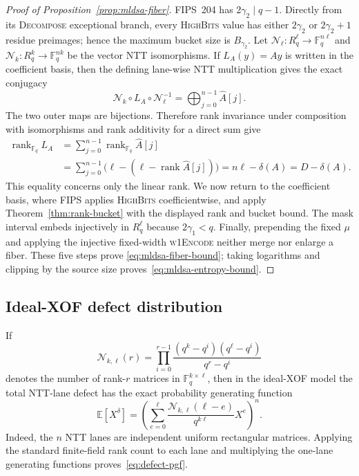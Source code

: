 \documentclass[pdflatex,sn-mathphys-num]{sn-jnl}
\theoremstyle{thmstyleone}
\theoremstyle{thmstyletwo}
\newcommand{\rank}{\operatorname{rank}}
\newcommand{\E}{\mathbb E}
\begin{document}
\begin{proof}[Proof of Proposition~\ref{prop:mldsa-fiber}]
FIPS~204 has $2\gamma_2\mid q-1$.  Directly from its
\textsc{Decompose} exceptional branch, every \textsc{HighBits} value has
either $2\gamma_2$ or $2\gamma_2+1$ residue preimages; hence the maximum
bucket size is $B_{\gamma_2}$.  Let
$\mathcal N_\ell:R_q^\ell\to\mathbb F_q^{n\ell}$ and
$\mathcal N_k:R_q^k\to\mathbb F_q^{nk}$ be the vector NTT isomorphisms.  If
$L_A(y)=Ay$ is written in the coefficient basis, then the defining lane-wise
NTT multiplication gives the exact conjugacy
\begin{equation}
 \mathcal N_k\circ L_A\circ\mathcal N_\ell^{-1}
   =\bigoplus_{j=0}^{n-1}\widehat A[j].
   \label{eq:mldsa-ntt-conjugacy}
\end{equation}
The two outer maps are bijections.  Therefore rank invariance under
composition with isomorphisms and rank additivity for a direct sum give
\begin{align*}
 \rank_{\mathbb F_q}L_A
 &=\sum_{j=0}^{n-1}\rank_{\mathbb F_q}\widehat A[j]\\
 &=\sum_{j=0}^{n-1}\bigl(\ell-(\ell-\rank\widehat A[j])\bigr)
   =n\ell-\delta(A)=D-\delta(A).
\end{align*}
This equality concerns only the linear rank.  We now return to the coefficient
basis, where FIPS applies \textsc{HighBits} coefficientwise, and apply
Theorem~\ref{thm:rank-bucket} with the displayed rank and bucket bound.  The
mask interval embeds injectively in $R_q^\ell$ because $2\gamma_1<q$.
Finally, prepending the fixed $\mu$ and applying the injective fixed-width
\textsc{w1Encode} neither merge nor enlarge a fiber.  These five steps prove
\eqref{eq:mldsa-fiber-bound}; taking logarithms and clipping by the source size
proves~\eqref{eq:mldsa-entropy-bound}.
\end{proof}

\subsection*{Ideal-XOF defect distribution}

If
\begin{equation}
 \mathcal N_{k,\ell}(r)=
 \prod_{i=0}^{r-1}
 \frac{(q^k-q^i)(q^\ell-q^i)}{q^r-q^i}              \label{eq:finite-field-rank-count}
\end{equation}
denotes the number of rank-$r$ matrices in
$\mathbb F_q^{k\times\ell}$, then in the ideal-XOF model the total NTT-lane
defect has the exact probability generating function
\begin{equation}
 \E[X^\delta]=
 \left(\sum_{e=0}^{\ell}
 \frac{\mathcal N_{k,\ell}(\ell-e)}{q^{k\ell}}X^e\right)^n. \label{eq:defect-pgf}
\end{equation}
Indeed, the $n$ NTT lanes are independent uniform rectangular matrices.
Applying the standard finite-field rank count to each lane and multiplying the
one-lane generating functions proves~\eqref{eq:defect-pgf}.
\end{document}
